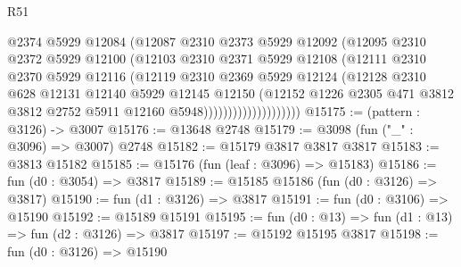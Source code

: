 \begin{lexlean}{R51}
\begin{coremodule}
                              @2374
                              @5929
                              @12084
                              (@12087
                                @2310
                                @2373
                                @5929
                                @12092
                                (@12095
                                  @2310
                                  @2372
                                  @5929
                                  @12100
                                  (@12103
                                    @2310
                                    @2371
                                    @5929
                                    @12108
                                    (@12111
                                      @2310
                                      @2370
                                      @5929
                                      @12116
                                      (@12119
                                        @2310
                                        @2369
                                        @5929
                                        @12124
                                        (@12128
                                          @2310
                                          @628
                                          @12131
                                          @12140
                                          @5929
                                          @12145
                                          @12150
                                          (@12152
                                            @1226
                                            @2305
                                            @471
                                            @3812
                                            @3812
                                            @2752
                                            @5911
                                            @12160
                                            @5948))))))))))))))))))))
@15175 := (pattern : @3126) -> @3007
@15176 := @13648 @2748
@15179 := @3098 (fun ("_" : @3096) => @3007) @2748
@15182 := @15179 @3817 @3817 @3817
@15183 := @3813 @15182
@15185 := @15176 (fun (leaf : @3096) => @15183)
@15186 := fun (d0 : @3054) => @3817
@15189 := @15185 @15186 (fun (d0 : @3126) => @3817)
@15190 := fun (d1 : @3126) => @3817
@15191 := fun (d0 : @3106) => @15190
@15192 := @15189 @15191
@15195 := fun (d0 : @13) => fun (d1 : @13) => fun (d2 : @3126) => @3817
@15197 := @15192 @15195 @3817
@15198 := fun (d0 : @3126) => @15190

\end{coremodule}
\end{lexlean}
